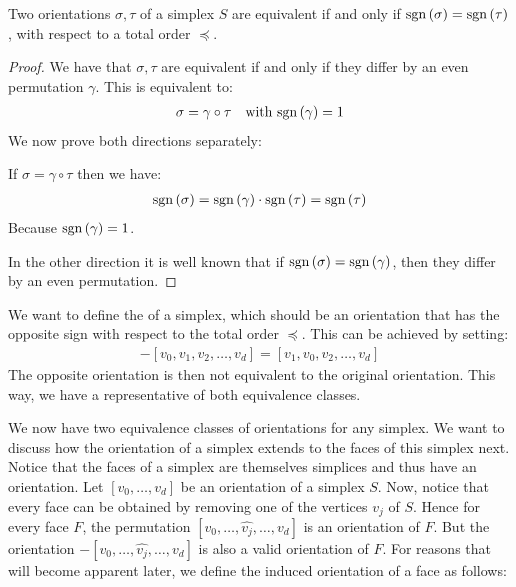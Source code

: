 \begin{lemma}
	Two orientations $\sigma, \tau$ of a simplex $S$ are equivalent if and only if $\operatorname{sgn}\left(\sigma\right) = \operatorname{sgn}\left(\tau\right)$, with respect to a total order $\preceq$.
\end{lemma}
\begin{proof}
    We have that $\sigma, \tau$ are equivalent if and only if they differ by an even permutation $\gamma$. This is equivalent to:
    \begin{align*}
        \sigma = \gamma \circ \tau \quad \text{with $\operatorname{sgn}\left(\gamma\right)=1$}
    \end{align*}
    We now prove both directions separately:

    If $\sigma = \gamma \circ \tau$ then we have:
    \begin{align*}
        \operatorname{sgn}\left(\sigma\right)= \operatorname{sgn}\left(\gamma\right) \cdot \operatorname{sgn}\left(\tau\right) = \operatorname{sgn}\left(\tau\right)
    \end{align*}
    Because $\operatorname{sgn}\left(\gamma\right)=1$.

    In the other direction it is well known that if $\operatorname{sgn}\left(\sigma\right)= \operatorname{sgn}\left(\gamma\right)$, then they differ by an even permutation.
\end{proof}

We want to define the  of a simplex, which should be an orientation that has the opposite sign with respect to the total order $\preceq$. This can be achieved by setting:
\begin{align*}
	- [v_0, v_1, v_2, \dots, v_d] = [v_1, v_0, v_2, \dots, v_d]
\end{align*}
The opposite orientation is then not equivalent to the original orientation. This way, we have a representative of both equivalence classes.

We now have two equivalence classes of orientations for any simplex. We want to discuss how the orientation of a simplex extends to the faces of this simplex next. Notice that the faces of a simplex are themselves simplices and thus have an orientation. Let $[v_0, \dots, v_{d}]$ be an orientation of a simplex $S$. Now, notice that every face can be obtained by removing one of the vertices $v_j$ of $S$. Hence for every face $F$, the permutation $[v_0, \dots, \hat{v_j}, \dots, v_{d}]$ is an orientation of $F$. But the orientation $- [v_0, \dots, \hat{v_j}, \dots, v_{d}]$ is also a valid orientation of $F$. For reasons that will become apparent later, we define the induced orientation of a face as follows:

